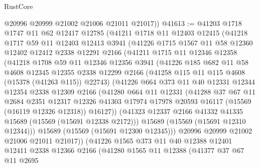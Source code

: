 \begin{lexlean}{RustCore}
\begin{coremodule}
        @20996
        @20999
        @21002
        @21006
        @21011
        @21017))
@41613 := @41203
    @1718
    @1747
    @11
    @62
    @12417
    @12785
    (@41211
      @1718
      @11
      @12403
      @12415
      (@41218
        @1717
        @59
        @11
        @12403
        @12413
        @3941
        (@41226
          @1715
          @1567
          @11
          @58
          @12360
          @12402
          @12412
          @2338
          @12291
          @2166
          (@41211
            @1715
            @11
            @12346
            @12358
            (@41218
              @1708
              @59
              @11
              @12346
              @12356
              @3941
              (@41226
                @185
                @682
                @11
                @58
                @4608
                @12345
                @12355
                @2338
                @12299
                @2166
                (@41258 @115 @11 @115 @4608 (@15378 (@41263 @115)) @22743)
                (@41226
                  @664
                  @373
                  @11
                  @40
                  @12331
                  @12344
                  @12354
                  @2338
                  @12309
                  @2166
                  (@41280
                    @664
                    @11
                    @12331
                    (@41288
                      @37
                      @67
                      @11
                      @2684
                      @2351
                      @12317
                      @12326
                      @41303
                      @17974
                      @17978
                      @20593
                      @16117
                      (@15569 (@16119 @12326 @12318))
                      @16127))
                  (@41323 @12337 @2166 @41332 @41335 @15689 (@15569 (@15691 @12338 @2172)))
                  @15689
                  (@15569 (@15691 @12310 @12344)))
                @15689
                (@15569 (@15691 @12300 @12345)))
              @20996
              @20999
              @21002
              @21006
              @21011
              @21017))
          (@41226
            @1565
            @373
            @11
            @40
            @12388
            @12401
            @12411
            @2338
            @12366
            @2166
            (@41280
              @1565
              @11
              @12388
              (@41377
                @37
                @67
                @11
                @2695

\end{coremodule}
\end{lexlean}
